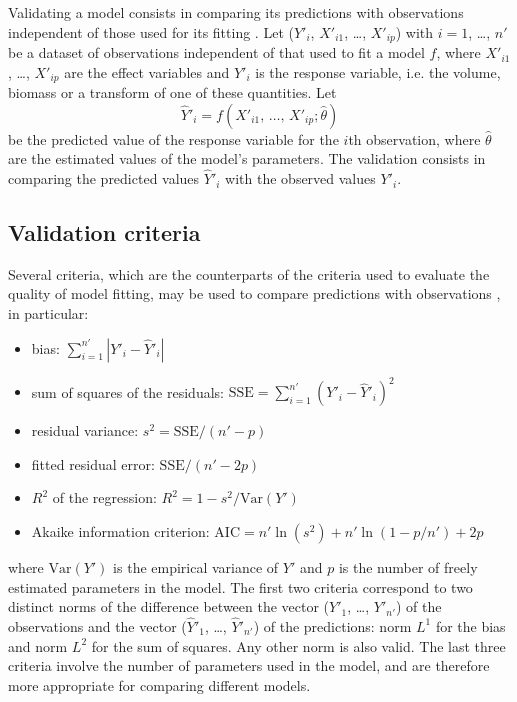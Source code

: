 Validating a model consists in comparing its predictions with observations independent of those used for its fitting \citep{rykiel96}. Let ($Y'_i$, $X'_{i1}$,
\ldots, $X'_{ip}$) with $i=1$, \ldots, $n'$ be a dataset of observations independent of that used to fit a model $f$, where $X'_{i1}$, \ldots, $X'_{ip}$ are the effect variables and $Y'_i$ is the response variable, i.e. the volume, biomass or a transform of one of these quantities. Let 
\[
\hat{Y}'_i=f(X'_{i1},\,\ldots,\,X'_{ip};\hat{\theta})
\]
be the predicted value of the response variable for the $i$th observation, where $\hat{\theta}$ are the estimated values of the model's parameters. The validation consists in comparing the predicted values $\hat{Y}'_i$ with the observed values $Y'_i$.

\subsection{Validation criteria\label{Ival}}

Several criteria, which are the counterparts of the criteria used to evaluate the quality of model fitting, may be used to compare predictions with observations \citep{schlaegel82,parresol99,tedeschi06}, in particular:
\begin{itemize}
\item bias: $\sum_{i=1}^{n'}|Y'_i-\hat{Y}'_i|$
\item sum of squares of the residuals:
$\mathrm{SSE}=\sum_{i=1}^{n'}(Y'_i-\hat{Y}'_i)^2$
\item residual variance: $s^2=\mathrm{SSE}/(n'-p)$
\item fitted residual error: $\mathrm{SSE}/(n'-2p)$
\item $R^2$ of the regression: $R^2=1-s^2/\mathrm{Var}(Y')$
\item Akaike information criterion: $\mathrm{AIC}=n'\ln(s^2)+
n'\ln(1-p/n')+2p$
\end{itemize}
where $\mathrm{Var}(Y')$ is the empirical variance of $Y'$ and $p$ is the number of freely estimated parameters in the model. The first two criteria correspond to two distinct norms of the difference between the vector ($Y'_1$, \ldots, $Y'_{n'}$) of the observations and the vector ($\hat{Y}'_1$, \ldots, $\hat{Y}'_{n'}$) of the predictions: norm $L^1$ for the bias and norm $L^2$ for the sum of squares. Any other norm is also valid. The last three criteria involve the number of parameters used in the model, and are therefore more appropriate for comparing different models.

